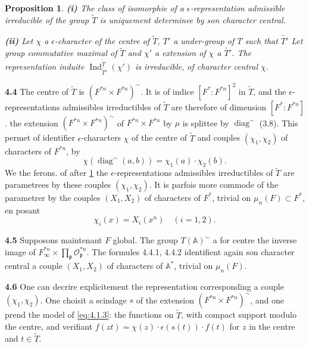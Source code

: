 \documentclass[12pt,a4paper]{article}
\theoremstyle{plain}
\newtheorem{proposition}[theorem]{Proposition}
\theoremstyle{definition}
\theoremstyle{remark}
\DeclareMathOperator{\Ind}{Ind}
\DeclareMathOperator{\diag}{diag}
\newcommand{\Af}{\mathbb{A}}
\newcommand{\cO}{\mathcal{O}}
\newcommand{\frakp}{\mathfrak{p}}
\newcommand{\wt}{\widetilde}
\providecommand{\cO}{\mathcal{O}}
\providecommand{\frakp}{\mathfrak{p}}
\begin{document}
\begin{proposition}\label{prop:4.3}
\textbf{(i)} The class of isomorphie of a $\epsilon$-representation admissible irreducible of the group $\wt{T}$ is uniquement determinee by son character central.

\textbf{(ii)} Let $\chi$ a $\epsilon$-character of the centre of $\wt{T}$, $T'$ a under-group of $T$ such that $\wt{T'}$ Let group commutative maximal of $\wt{T}$ and $\chi'$ a extension of $\chi$ a $\wt{T'}$. The representation induite $\Ind_{\wt{T'}}^{\wt{T}}(\chi')$ is irreducible, of character central $\chi$.
\end{proposition}

\textbf{4.4} The centre of $\wt{T}$ is $(F^{*n} \times F^{*n})^\sim$. It is of indice $[F^* : F^{*n}]^2$ in $\wt{T}$, and the $\epsilon$-representations admissibles irreductibles of $\wt{T}$ are therefore of dimension $[F^* : F^{*n}]$. the extension $(F^{*n} \times F^{*n})^\sim$ of $F^{*n} \times F^{*n}$ by $\mu$ is splittee by $\diag^\sim$ (3.8). This permet of identifier $\epsilon$-characters $\chi$ of the centre of $\wt{T}$ and couples $(\chi_1, \chi_2)$ of characters of $F^{*n}$, by
\begin{equation}\label{eq:4.4.1}
\chi(\diag^\sim(a, b)) = \chi_1(a) \cdot \chi_2(b).
\tag{4.4.1}
\end{equation}
We the ferons. of after \ref{prop:4.3} the $\epsilon$-representations admissibles irreductibles of $\wt{T}$ are parametrees by these couples $(\chi_1, \chi_2)$. It is parfois more commode of the parametrer by the couples $(X_1, X_2)$ of characters of $F^*$, trivial on $\mu_n(F) \subset F^*$, en posant
\begin{equation}\label{eq:4.4.2}
\chi_i(x) = X_i(x^n) \quad (i = 1, 2).
\tag{4.4.2}
\end{equation}

\textbf{4.5} Supposons maintenant $F$ global. The group $T(\Af)^\sim$ a for centre the inverse image of $F_\infty^{*n} \times \prod_\frakp \cO_\frakp^{*n}$. The formules 4.4.1, 4.4.2 identifient again son character central a couple $(X_1, X_2)$ of characters of $\Af^*$, trivial on $\mu_n(F)$.

\textbf{4.6} One can decrire explicitement the representation corresponding a couple $(\chi_1, \chi_2)$. One choisit a scindage $s$ of the extension $(F^{*n} \times F^{*n})^\sim$, and one prend the model of \eqref{eq:4.1.3}: the functions on $\wt{T}$, with compact support modulo the centre, and verifiant $f(zt) = \chi(z) \cdot \epsilon(s(t)) \cdot f(t)$ for $z$ in the centre and $t \in \wt{T}$.
\end{document}

